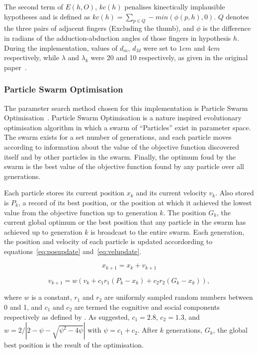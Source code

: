 \documentclass[10pt,a4paper,notitlepage,twocolumn]{report}
\begin{document}
The second term of $E(h, O)$, $kc(h)$  penalises kinectically implausible hypotheses and is defined as $kc(h) = \sum_{p \in Q} - min(\phi(p, h), 0)$.  $Q$ denotes the three pairs of adjacent fingers (Excluding the thumb), and $\phi$ is the difference in radians of the adduction-abduction angles of those fingers in hypothesis $h$.  During the implementation, values of $d_m$, $d_M$ were set to $1cm$ and $4cm$ respectively, while $\lambda$ and $\lambda_k$ were 20 and 10 respectively, as given in the original paper~\cite{bmvc2011oikonom}.

    \subsubsection{Particle Swarm Optimisation}

  The parameter search method chosen for this implementation is Particle Swarm
Optimisation~\cite{kennedy1995particle}.  Particle Swarm Optimisation is a
nature inspired evolutionary optimisation algorithm in which a swarm of
``Particles'' exist in parameter space. The swarm exists for a set number of
generations, and each particle moves according to information about the value of
the objective function discovered itself and by other particles in the swarm.
Finally, the optimum foud by the swarm is the best value of the objective
function found by any particle over all generations.

  Each particle stores its current position $x_k$ and its current velocity $v_k$.  Also stored is $P_k$, a record of its best position, or the position at which it achieved the lowest value from the objective function up to generation $k$.  The position $G_k$, the current global optimum or the best position that any particle in the swarm has achieved up to generation $k$ is broadcast to the entire swarm.  Each generation, the position and velocity of each particle is updated accordording to equations~\ref{eq:posupdate} and~\ref{eq:velupdate}.

\begin{equation}
  \label{eq:posupdate}
  x_{k+1} = x_k + v_{k+1}
\end{equation}

\begin{equation}
  \label{eq:velupdate}
  v_{k+1} = w(v_k + c_1r_1(P_k - x_k) + c_2r_2(G_k - x_k)), 
\end{equation}

where $w$ is a constant, $r_1$ and $r_2$ are uniformly sampled random numbers
between 0 and 1, and $c_1$ and $c_2$ are termed the cognitive and social
components respectively as defined by .  As suggested, $c_1 = 2.8$, $c_2 = 1.3$,
and $w = 2 / \left | 2 - \psi - \sqrt{\psi^2 - 4 \psi} \right |$ with $\psi =
c_1 + c_2$.  After $k$ generations, $G_k$, the global best position is the
result of the optimisation.
\end{document}
